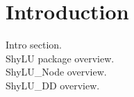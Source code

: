 
\chapter{Introduction}
\label{C:intro}

\noindent
{}

\noindent
Intro section.
\\
ShyLU package overview.
\\
ShyLU\_Node overview.
\\
ShyLU\_DD overview.

